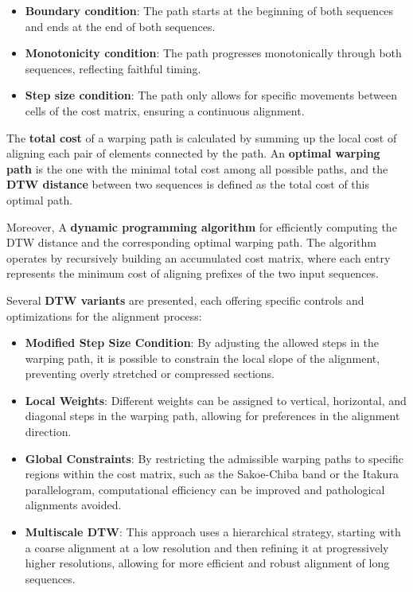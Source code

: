\documentclass[a4paper, 9pt, twocolumn]{extarticle}
\begin{document}
    \begin{itemize}
    \item
      \textbf{Boundary condition}: The path starts at the beginning of both
      sequences and ends at the end of both sequences.
    \item
      \textbf{Monotonicity condition}: The path progresses monotonically
      through both sequences, reflecting faithful timing.
    \item
      \textbf{Step size condition}: The path only allows for specific
      movements between cells of the cost matrix, ensuring a continuous
      alignment.
    \end{itemize}
    
    The \textbf{total cost} of a warping path is calculated by summing up
    the local cost of aligning each pair of elements connected by the path.
    An \textbf{optimal warping path} is the one with the minimal total cost
    among all possible paths, and the \textbf{DTW distance} between two
    sequences is defined as the total cost of this optimal path.
    
    Moreover, A \textbf{dynamic programming algorithm} for efficiently
    computing the DTW distance and the corresponding optimal warping path.
    The algorithm operates by recursively building an accumulated cost
    matrix, where each entry represents the minimum cost of aligning
    prefixes of the two input sequences.
    
    Several \textbf{DTW variants} are presented, each offering specific
    controls and optimizations for the alignment process:
    
    \begin{itemize}
    \item
      \textbf{Modified Step Size Condition}: By adjusting the allowed steps
      in the warping path, it is possible to constrain the local slope of
      the alignment, preventing overly stretched or compressed sections.
    \item
      \textbf{Local Weights}: Different weights can be assigned to vertical,
      horizontal, and diagonal steps in the warping path, allowing for
      preferences in the alignment direction.
    \item
      \textbf{Global Constraints}: By restricting the admissible warping
      paths to specific regions within the cost matrix, such as the
      Sakoe-Chiba band or the Itakura parallelogram, computational
      efficiency can be improved and pathological alignments avoided.
    \item
      \textbf{Multiscale DTW}: This approach uses a hierarchical strategy,
      starting with a coarse alignment at a low resolution and then refining
      it at progressively higher resolutions, allowing for more efficient
      and robust alignment of long sequences.
    \end{itemize}
    
\end{document}
